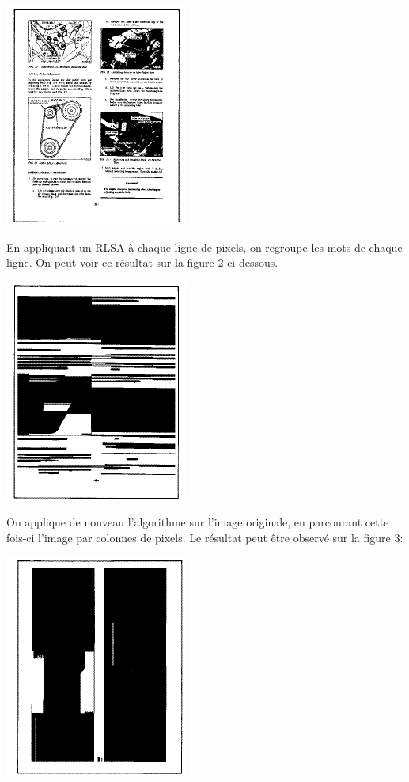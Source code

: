\documentclass [french,12pt]{article}
\begin{document}
\begin{center} \includegraphics[scale=0.4]{rlsa_fig1} \end{center}

En appliquant un RLSA à chaque ligne de pixels, on regroupe les mots de chaque ligne. On peut voir ce résultat sur la figure 2 ci-dessous.

\begin{center} \includegraphics[scale=0.4]{rlsa_fig2} \end{center}

On applique de nouveau l'algorithme sur l'image originale, en parcourant cette fois-ci l'image par colonnes de pixels. Le résultat peut être observé sur la figure 3:

\begin{center} \includegraphics[scale=0.4]{rlsa_fig3} \end{center}
\end{document}
